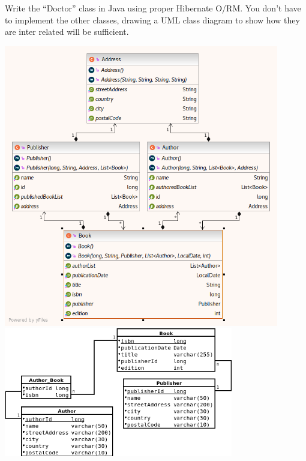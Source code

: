 \documentclass[addpoints,12pt]{exam}
\begin{document}
\begin{questions}
Write the ``Doctor'' class in Java using proper Hibernate O/RM. You don't have to implement the other classes, drawing a UML class diagram to show how they are inter related will be sufficient.

\includegraphics[width=12cm]{ajmt_uml.png}\\
\includegraphics[width=10cm]{ajmt_schema.png}\\
\end{questions}



\end{document}
